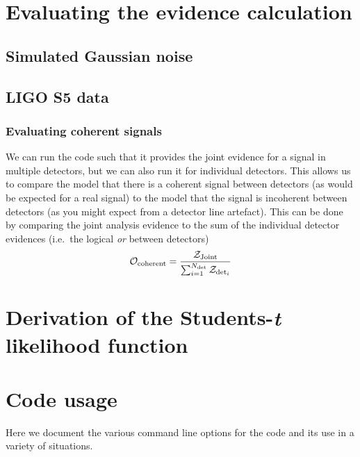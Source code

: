 \documentclass[aps,prd,showpacs,superscriptaddress,twocolumn,preprintnumbers,altaffilletter]{revtex4-1}
\begin{document}
\section{Evaluating the evidence calculation}

\subsection{Simulated Gaussian noise}

\subsection{LIGO S5 data}

\subsubsection{Evaluating coherent signals}

We can run the code such that it provides the joint evidence for a signal in multiple detectors, but
we can also run it for individual detectors. This allows us to compare the model that there is a
coherent signal between detectors (as would be expected for a real signal) to the model that the
signal is incoherent between detectors (as you might expect from a detector line artefact). This can
be done by comparing the joint analysis evidence to the sum of the individual detector evidences
(i.e.\ the logical {\it or} between detectors)
\begin{equation}
\mathcal{O}_{\rm coherent} = \frac{\mathcal{Z}_{\rm Joint}}{\sum_{i=1}^{N_{\rm det}} \mathcal{Z}_{{\rm det}_i}}
\end{equation}

\appendix

\section{Derivation of the Students-{\it t} likelihood function}

\section{Code usage}

Here we document the various command line options for the code and its use in a variety of situations.


\end{document}
